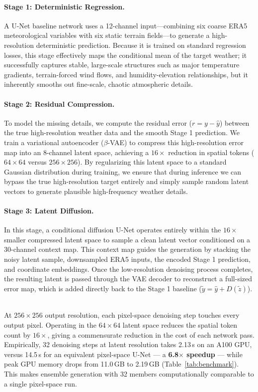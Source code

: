 \documentclass[10pt]{article}
\begin{document}
\paragraph{Stage 1: Deterministic Regression.} A U-Net baseline network uses a 12-channel input—combining six coarse ERA5 meteorological variables with six static terrain fields—to generate a high-resolution deterministic prediction. Because it is trained on standard regression losses, this stage effectively maps the conditional mean of the target weather; it successfully captures stable, large-scale structures such as major temperature gradients, terrain-forced wind flows, and humidity-elevation relationships, but it inherently smooths out fine-scale, chaotic atmospheric details.

\paragraph{Stage 2: Residual Compression.} To model the missing details, we compute the residual error ($r = y - \hat{y}$) between the true high-resolution weather data and the smooth Stage 1 prediction. We train a variational autoencoder ($\beta$-VAE) to compress this high-resolution error map into an 8-channel latent space, achieving a $16\times$ reduction in spatial tokens ($64\times64$ versus $256\times256$). By regularizing this latent space to a standard Gaussian distribution during training, we ensure that during inference we can bypass the true high-resolution target entirely and simply sample random latent vectors to generate plausible high-frequency weather details.

\paragraph{Stage 3: Latent Diffusion.} In this stage, a conditional diffusion U-Net operates entirely within the $16\times$ smaller compressed latent space to sample a clean latent vector conditioned on a 30-channel context map. This context map guides the generation by stacking the noisy latent sample, downsampled ERA5 inputs, the encoded Stage 1 prediction, and coordinate embeddings. Once the low-resolution denoising process completes, the resulting latent is passed through the VAE decoder to reconstruct a full-sized error map, which is added directly back to the Stage 1 baseline ($\tilde{y} = \hat{y} + D(\tilde{z})$).

\\

At $256\times256$ output resolution, each pixel-space denoising step touches every output pixel. Operating in the $64\times64$ latent space reduces the spatial token count by $16\times$, giving a commensurate reduction in the cost of each network pass. Empirically, 32 denoising steps at latent resolution takes 2.13\,s on an A100 GPU, versus 14.5\,s for an equivalent pixel-space U-Net --- a \textbf{6.8$\times$ speedup} --- while peak GPU memory drops from 11.0\,GB to 2.19\,GB (Table~\ref{tab:benchmark}). This makes ensemble generation with 32 members computationally comparable to a single pixel-space run.
\end{document}
